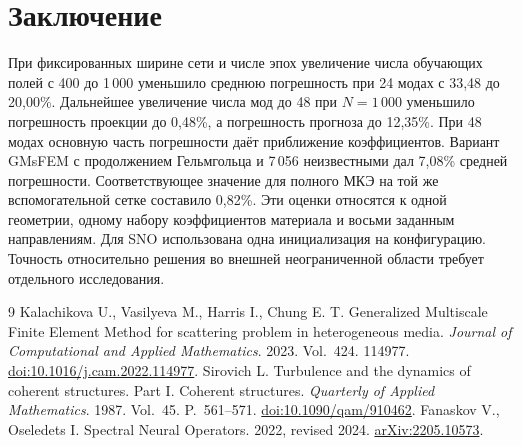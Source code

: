 \documentclass[11pt,a4paper]{article}
\begin{document}
\section{Заключение}
При фиксированных ширине сети и числе эпох увеличение числа обучающих полей с 400 до 1\,000 уменьшило среднюю погрешность при 24 модах с 33,48 до 20,00\%. Дальнейшее увеличение числа мод до 48 при $N=1\,000$ уменьшило погрешность проекции до 0,48\%, а погрешность прогноза до 12,35\%. При 48 модах основную часть погрешности даёт приближение коэффициентов.
Вариант GMsFEM с продолжением Гельмгольца и 7\,056 неизвестными дал 7,08\% средней погрешности. Соответствующее значение для полного МКЭ на той же вспомогательной сетке составило 0,82\%. Эти оценки относятся к одной геометрии, одному набору коэффициентов материала и восьми заданным направлениям. Для SNO использована одна инициализация на конфигурацию. Точность относительно решения во внешней неограниченной области требует отдельного исследования.

\begingroup\small\begin{thebibliography}{9}\setlength{\itemsep}{0pt}
 Kalachikova U., Vasilyeva M., Harris I., Chung E. T. Generalized Multiscale Finite Element Method for scattering problem in heterogeneous media. \emph{Journal of Computational and Applied Mathematics}. 2023. Vol.~424. 114977. \href{https://doi.org/10.1016/j.cam.2022.114977}{doi:10.1016/j.cam.2022.114977}.
 Sirovich L. Turbulence and the dynamics of coherent structures. Part I. Coherent structures. \emph{Quarterly of Applied Mathematics}. 1987. Vol.~45. P.~561--571. \href{https://doi.org/10.1090/qam/910462}{doi:10.1090/qam/910462}.
 Fanaskov V., Oseledets I. Spectral Neural Operators. 2022, revised 2024. \href{https://arxiv.org/abs/2205.10573}{arXiv:2205.10573}.
\end{thebibliography}\endgroup
\end{document}
